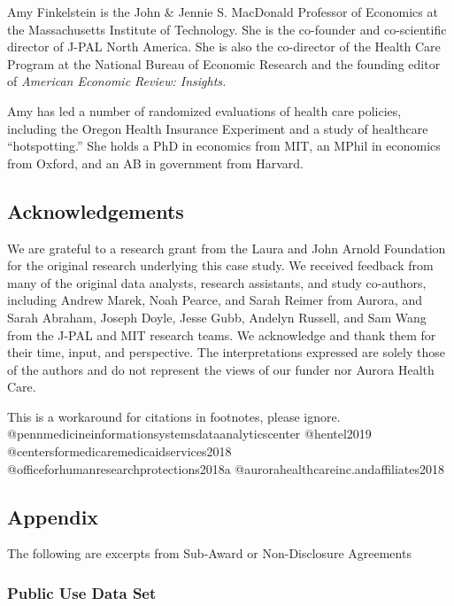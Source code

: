 \documentclass[
]{WileySix}
\begin{document}
Amy Finkelstein is the John \& Jennie S. MacDonald Professor of Economics at the Massachusetts Institute of Technology. She is the co-founder and co-scientific director of J-PAL North America. She is also the co-director of the Health Care Program at the National Bureau of Economic Research and the founding editor of \emph{American Economic Review: Insights.}

Amy has led a number of randomized evaluations of health care policies, including the Oregon Health Insurance Experiment and a study of healthcare ``hotspotting.'' She holds a PhD in economics from MIT, an MPhil in economics from Oxford, and an AB in government from Harvard.

\hypertarget{acknowledgements-2}{%
\subsection*{Acknowledgements}\label{acknowledgements-2}}

We are grateful to a research grant from the Laura and John Arnold Foundation for the original research underlying this case study. We received feedback from many of the original data analysts, research assistants, and study co-authors, including Andrew Marek, Noah Pearce, and Sarah Reimer from Aurora, and Sarah Abraham, Joseph Doyle, Jesse Gubb, Andelyn Russell, and Sam Wang from the J-PAL and MIT research teams. We acknowledge and thank them for their time, input, and perspective. The interpretations expressed are solely those of the authors and do not represent the views of our funder nor Aurora Health Care.

\begin{invisible}
This is a workaround for citations in footnotes, please ignore.
@pennmedicineinformationsystemsdataanalyticscenter @hentel2019
@centersformedicaremedicaidservices2018
@officeforhumanresearchprotections2018a
@aurorahealthcareinc.andaffiliates2018
\end{invisible}

\hypertarget{appendix-4}{%
\subsection*{Appendix}\label{appendix-4}}

The following are excerpts from Sub-Award or Non-Disclosure Agreements

\hypertarget{public-use-data-set}{%
\subsubsection*{Public Use Data Set}\label{public-use-data-set}}
\end{document}
